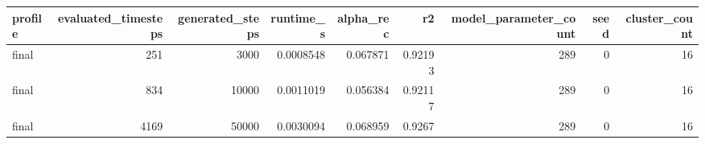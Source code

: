 \begin{tabular}{lrrrrrrrr}
\toprule
profile & evaluated\_timesteps & generated\_steps & runtime\_s & alpha\_rec & r2 & model\_parameter\_count & seed & cluster\_count \\
\midrule
final & 251 & 3000 & 0.0008548 & 0.067871 & 0.92193 & 289 & 0 & 16 \\
final & 834 & 10000 & 0.0011019 & 0.056384 & 0.92117 & 289 & 0 & 16 \\
final & 4169 & 50000 & 0.0030094 & 0.068959 & 0.9267 & 289 & 0 & 16 \\
\bottomrule
\end{tabular}
